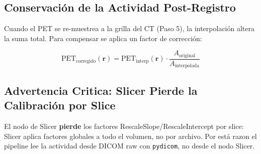 \documentclass[12pt,a4paper]{article}
\begin{document}
\subsection{Conservación de la Actividad Post-Registro}

Cuando el PET se re-muestrea a la grilla del CT (Paso 5), la interpolación altera la suma total.
Para compensar se aplica un factor de corrección:

\begin{equation}\label{eq:conservacion}
    \text{PET}_{\text{corregido}}(\mathbf{r}) =
    \text{PET}_{\text{interp}}(\mathbf{r}) \cdot
    \frac{A_{\text{original}}}{A_{\text{interpolada}}}
\end{equation}

\subsection{Advertencia Critica: Slicer Pierde la Calibración por Slice}

El nodo de Slicer \textbf{pierde} los factores RescaleSlope/RescaleIntercept por slice: Slicer
aplica factores globales a todo el volumen, no por archivo. Por está razon el pipeline lee la
actividad desde DICOM raw con \texttt{pydicom}, no desde el nodo Slicer.
\end{document}
